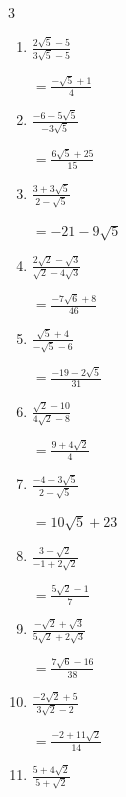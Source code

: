 \begin{multicols}{3}
\begin{enumerate}
        $\displaystyle =\frac{-11+3\sqrt{10}}{31}$

  \item $\displaystyle \frac{2\sqrt{5}-5}{3\sqrt{5}-5}$

        $\displaystyle =\frac{-\sqrt{5}+1}{4}$

  \item $\displaystyle \frac{-6-5\sqrt{5}}{-3\sqrt{5}}$

        $\displaystyle =\frac{6\sqrt{5}+25}{15}$

\columnbreak %

\resetques

  \item $\displaystyle \frac{3+3\sqrt{5}}{2-\sqrt{5}}$

        $\displaystyle =-21-9\sqrt{5}$

  \item $\displaystyle \frac{2\sqrt{2}-\sqrt{3}}{\sqrt{2}-4\sqrt{3}}$

        $\displaystyle =\frac{-7\sqrt{6}+8}{46}$

  \item $\displaystyle \frac{\sqrt{5}+4}{-\sqrt{5}-6}$

        $\displaystyle =\frac{-19-2\sqrt{5}}{31}$

  \item $\displaystyle \frac{\sqrt{2}-10}{4\sqrt{2}-8}$

        $\displaystyle =\frac{9+4\sqrt{2}}{4}$

  \item $\displaystyle \frac{-4-3\sqrt{5}}{2-\sqrt{5}}$

        $\displaystyle =10\sqrt{5}+23$

\columnbreak %

  \item $\displaystyle \frac{3-\sqrt{2}}{-1+2\sqrt{2}}$

        $\displaystyle =\frac{5\sqrt{2}-1}{7}$

  \item $\displaystyle \frac{-\sqrt{2}+\sqrt{3}}{5\sqrt{2}+2\sqrt{3}}$

        $\displaystyle =\frac{7\sqrt{6}-16}{38}$

  \item $\displaystyle \frac{-2\sqrt{2}+5}{3\sqrt{2}-2}$

        $\displaystyle =\frac{-2+11\sqrt{2}}{14}$

  \item $\displaystyle \frac{5+4\sqrt{2}}{5+\sqrt{2}}$


\end{enumerate}
\end{multicols}
